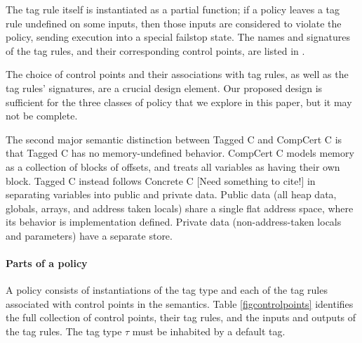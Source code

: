 \documentclass{llncs}
\begin{document}
\begin{table}[t]
\begin{minipage}[t]{0.37\textwidth}
  \binopsteptagless
\end{minipage}
\begin{minipage}[t]{0.6\textwidth}
  \binopstep
\end{minipage}

The tag rule itself is instantiated as a partial function; if a policy leaves a tag rule
undefined on some inputs, then those inputs are considered to violate the policy, sending
execution into a special failstop state. The names and signatures of the tag rules,
and their corresponding control points, are listed in .

The choice of control points and their associations with tag rules, as well as the tag rules'
signatures, are a crucial design element. Our proposed design is sufficient for the three classes of
policy that we explore in this paper, but it may not be complete.

The second major semantic distinction between Tagged C and CompCert C is that Tagged C has no
memory-undefined behavior. CompCert C models memory as a collection of blocks of offsets,
and treats all variables as having their own block. Tagged C instead follows Concrete C
\cite{} [Need something to cite!] in separating variables into public and private data.
Public data (all heap data, globals, arrays, and address taken locals) share a single flat address
space, where its behavior is implementation defined. 
Private data (non-address-taken locals and parameters) have a separate store.


\paragraph*{Parts of a policy}

A policy consists of instantiations of the tag type
and each of the tag rules associated with control points in the semantics. Table \cref{figcontrolpoints}
identifies the full collection of control points, their tag rules, and the inputs and outputs of the tag rules.
The tag type \(\tau\) must be inhabited by a default tag.


\end{table}
\end{document}
